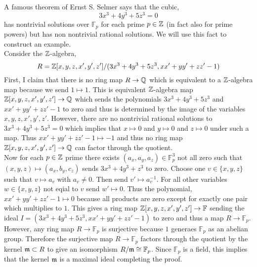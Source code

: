 \documentclass[12pt]{article}
\begin{document}
A famous theorem of Ernst S. Selmer says that the cubic,
\[ 3 x^3 + 4 y^3 + 5 z^3 = 0 \]
has nontrivial solutions over $\mathbb{F}_p$ for each prime $p \in \mathbb{Z}$ (in fact also for prime powers) but has non nontrivial rational solutions. We will use this fact to construct an example. 
\bigskip\\
Consider the $\mathbb{Z}$-algebra,
\[ R = \mathbb{Z}[x,y,z,x',y',z'] / (3 x^3 + 4 y^3 + 5 z^3, x x' + y y' + z z' - 1) \]
First, I claim that there is no ring map $R \to \mathbb{Q}$ which is equivalent to a $\mathbb{Z}$-algebra map because we send $1 \mapsto 1$. This is equivalent $\mathbb{Z}$-algebra map $\mathbb{Z}[x, y, z, x', y', z'] \to \mathbb{Q}$ which sends the polynomials $3 x^3 + 4 y^3 + 5 z^3$ and $x x' + y y' + z z' - 1$ to zero and thus is determined by the image of the variables $x, y, z, x', y', z'$. However, there are no nontrivial rational solutions to $3 x^3 + 4 y^3 + 5 z^3 = 0$ which implies that $x \mapsto 0$ and $y \mapsto 0$ and $z \mapsto 0$ under such a map. Thus $x x' + y y' + z z' - 1 \mapsto -1$ and thus no ring map $\mathbb{Z}[x, y, z, x', y', z'] \to \mathbb{Q}$ can factor through the quotient. 
\bigskip\\
Now for each $p \in \mathbb{Z}$ prime there exists $(a_x, a_y, a_z) \in \mathbb{F}_p^3$ not all zero such that $(x, y, z) \mapsto (a_x, b_y, c_z)$ sends $3 x^3 + 4 y^3 + z^3$ to zero. Choose one $v \in \{x, y, z\}$ such that $v \mapsto a_v$ with $a_v \neq 0$. Then send $v' \mapsto a_v^{-1}$. For all other variables $w \in \{ x, y, z \}$ not eqial to $v$ send $w' \mapsto 0$. Thus the polynomial, $xx' + yy' + zz' - 1 \mapsto 0$ because all products are zero except for exactly one pair which multiplies to $1$. This gives a ring map $\mathbb{Z}[x, y, z, x', y', z'] \to \mathbb{F}$ sending the ideal $I = (3 x^3 + 4 y^3 + 5 z^3, x x' + y y' + z z' - 1)$ to zero and thus a map $R \to \mathbb{F}_p$. However, any ring map $R \to \mathbb{F}_p$ is surjective because $1$ generaes $\mathbb{F}_p$ as an abelian group. Therefore the surjective map $R \to \mathbb{F}_p$ factors through the quotient by the kernel $\mathfrak{m} \subset R$ to give an isomorphism $R / \mathfrak{m} \cong \mathbb{F}_p$. Since $\mathbb{F}_p$ is a field, this implies that the kernel $\mathfrak{m}$ is a maximal ideal completing the proof. 
\end{document}
